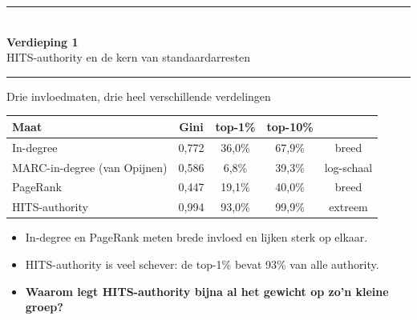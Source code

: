 \documentclass[aspectratio=169,11pt]{beamer}
\newcommand{\rd}[1]{\textcolor{uvared}{#1}}
\newcommand{\gr}[1]{\textcolor{uvagray}{#1}}
\newcommand{\smallnote}[1]{{\footnotesize\color{uvagray}#1}}
\begin{document}
\begin{frame}[plain]
  \centering
  \vspace{1.4cm}
  {\color{uvared}\rule{0.5\textwidth}{1.2pt}}\\[0.7em]
  {\Large\bfseries Verdieping 1}\\[0.4em]
  {\large HITS-authority en de kern van standaardarresten}\\[0.7em]
  {\color{uvared}\rule{0.5\textwidth}{1.2pt}}
\end{frame}

\begin{frame}{Drie invloedmaten, drie heel verschillende verdelingen}
  \footnotesize
  \begin{table}
    \centering\renewcommand{\arraystretch}{1.2}
    \begin{tabular}{@{}lcccc@{}}
      \toprule
      Maat & Gini & top-1\% & top-10\% & \\
      \midrule
      In-degree & 0,772 & 36,0\% & 67,9\% & \gr{breed} \\
      MARC-in-degree \smallnote{(van Opijnen)} & 0,586 & 6,8\% & 39,3\% & \gr{log-schaal} \\
      PageRank & 0,447 & 19,1\% & 40,0\% & \gr{breed} \\
      \rd{HITS-authority} & \rd{0,994} & \rd{93,0\%} & \rd{99,9\%} & \rd{extreem} \\
      \bottomrule
    \end{tabular}
  \end{table}
  \vspace{0.4em}
  \begin{itemize}
    \item In-degree en PageRank meten \rd{brede} invloed en lijken sterk op elkaar.
    \item HITS-authority is veel schever: de top-1\% bevat 93\% van alle authority.
    \item[$\Rightarrow$] \textbf{Waarom legt HITS-authority bijna al het gewicht op zo'n kleine groep?}
  \end{itemize}
\end{frame}
\end{document}
